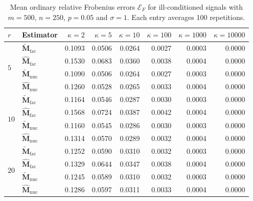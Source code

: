 \documentclass[numsec,webpdf,modern,large,namedate]{oup-authoring-template}
\theoremstyle{plain}
\theoremstyle{remark}
\newcommand{\M}{\bm{M}}
\begin{document}
\begin{table}[!htbp]
\centering
\caption{Mean ordinary relative Frobenius errors $\mathcal E_F$ for ill-conditioned signals with $m=500$, $n=250$, $p=0.05$ and $\sigma=1$. Each entry averages 100 repetitions.}
\label{tab:supp:ill_fnorm}
\begingroup
\small
{}
\setlength{\tabcolsep}{3.2pt}
\begin{tabular}{@{}llrrrrrr@{}}
\toprule
$r$ & Estimator & $\kappa=2$ & $\kappa=5$ & $\kappa=10$ & $\kappa=100$ & $\kappa=1000$ & $\kappa=10000$ \\
\midrule
\multirow{4}{*}{$5$} & $\widetilde{\M}_{\mathrm{fac}}$ & 0.1093 & 0.0506 & 0.0264 & 0.0027 & 0.0003 & 0.0000 \\
 & $\widehat{\M}_{\mathrm{fac}}$ & 0.1530 & 0.0683 & 0.0360 & 0.0038 & 0.0004 & 0.0000 \\
 & $\widetilde{\M}_{\mathrm{nuc}}$ & 0.1090 & 0.0506 & 0.0264 & 0.0027 & 0.0003 & 0.0000 \\
 & $\widehat{\M}_{\mathrm{nuc}}$ & 0.1260 & 0.0528 & 0.0265 & 0.0033 & 0.0004 & 0.0000 \\
\midrule
\multirow{4}{*}{$10$} & $\widetilde{\M}_{\mathrm{fac}}$ & 0.1164 & 0.0546 & 0.0287 & 0.0030 & 0.0003 & 0.0000 \\
 & $\widehat{\M}_{\mathrm{fac}}$ & 0.1568 & 0.0724 & 0.0387 & 0.0042 & 0.0004 & 0.0000 \\
 & $\widetilde{\M}_{\mathrm{nuc}}$ & 0.1160 & 0.0545 & 0.0286 & 0.0030 & 0.0003 & 0.0000 \\
 & $\widehat{\M}_{\mathrm{nuc}}$ & 0.1314 & 0.0570 & 0.0289 & 0.0032 & 0.0004 & 0.0000 \\
\midrule
\multirow{4}{*}{$20$} & $\widetilde{\M}_{\mathrm{fac}}$ & 0.1252 & 0.0590 & 0.0310 & 0.0032 & 0.0003 & 0.0000 \\
 & $\widehat{\M}_{\mathrm{fac}}$ & 0.1329 & 0.0644 & 0.0347 & 0.0038 & 0.0004 & 0.0000 \\
 & $\widetilde{\M}_{\mathrm{nuc}}$ & 0.1245 & 0.0589 & 0.0310 & 0.0032 & 0.0003 & 0.0000 \\
 & $\widehat{\M}_{\mathrm{nuc}}$ & 0.1286 & 0.0597 & 0.0311 & 0.0033 & 0.0004 & 0.0000 \\
\bottomrule
\end{tabular}
\endgroup
\end{table}
\end{document}
